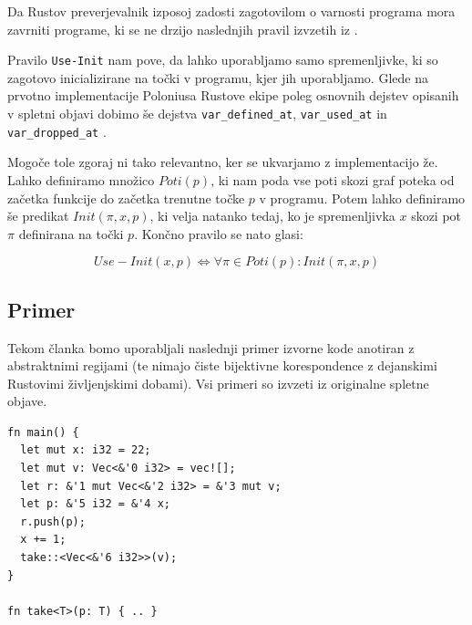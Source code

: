 \documentclass{article}
\begin{document}
Da Rustov preverjevalnik izposoj zadosti zagotovilom o varnosti programa mora zavrniti programe,
ki se ne drzijo naslednjih pravil izvzetih iz \cite{stjernaModellingRustsReference}.


Pravilo \verb|Use-Init| nam pove, da lahko uporabljamo samo spremenljivke, ki so zagotovo inicializirane
na točki v programu, kjer jih uporabljamo. Glede na prvotno implementacije Poloniusa Rustove ekipe poleg 
osnovnih dejstev opisanih v spletni objavi dobimo še dejstva \verb|var_defined_at|, \verb|var_used_at| in 
\verb|var_dropped_at| \cite{RustlangPoloniusDefines}.

Mogoče tole zgoraj ni tako relevantno, ker se ukvarjamo z implementacijo že. Lahko definiramo množico
$Poti(p)$, ki nam poda vse poti skozi graf poteka od začetka funkcije do začetka trenutne točke $p$
v programu. Potem lahko definiramo še predikat $Init(\pi, x, p)$, ki velja natanko tedaj, ko je spremenljivka
$x$ skozi pot $\pi$ definirana na točki $p$. Končno pravilo se nato glasi:
    
\begin{equation}
    Use-Init(x, p) \iff \forall \pi \in Poti(p): Init(\pi, x, p)
\end{equation} 



\subsection{Primer}

Tekom članka bomo uporabljali naslednji primer izvorne kode anotiran z abstraktnimi regijami (te nimajo čiste bijektivne korespondence z
dejanskimi Rustovimi življenjskimi dobami). Vsi primeri so izvzeti iz originalne spletne objave.

\begin{lstlisting}
fn main() {
  let mut x: i32 = 22;
  let mut v: Vec<&'0 i32> = vec![];
  let r: &'1 mut Vec<&'2 i32> = &'3 mut v;
  let p: &'5 i32 = &'4 x;
  r.push(p);
  x += 1;
  take::<Vec<&'6 i32>>(v);
}

fn take<T>(p: T) { .. }
\end{lstlisting}
\end{document}
